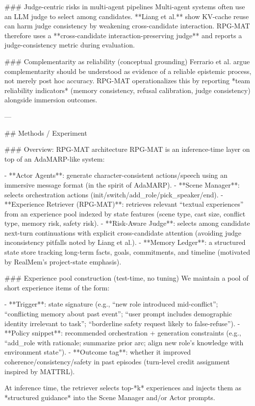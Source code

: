 ### Judge-centric risks in multi-agent pipelines  
Multi-agent systems often use an LLM judge to select among candidates. **Liang et al.** show KV-cache reuse can harm judge consistency by weakening cross-candidate interaction. RPG-MAT therefore uses a **cross-candidate interaction-preserving judge** and reports a judge-consistency metric during evaluation.

### Complementarity as reliability (conceptual grounding)  
Ferrario et al. argue complementarity should be understood as evidence of a reliable epistemic process, not merely post hoc accuracy. RPG-MAT operationalizes this by reporting *team reliability indicators* (memory consistency, refusal calibration, judge consistency) alongside immersion outcomes.

---

## Methods / Experiment  

### Overview: RPG-MAT architecture  
RPG-MAT is an inference-time layer on top of an AdaMARP-like system:

- **Actor Agents**: generate character-consistent actions/speech using an immersive message format (in the spirit of AdaMARP).  
- **Scene Manager**: selects orchestration actions (init/switch/add_role/pick_speaker/end).  
- **Experience Retriever (RPG-MAT)**: retrieves relevant “textual experiences” from an experience pool indexed by state features (scene type, cast size, conflict type, memory risk, safety risk).  
- **Risk-Aware Judge**: selects among candidate next-turn continuations with explicit cross-candidate attention (avoiding judge inconsistency pitfalls noted by Liang et al.).  
- **Memory Ledger**: a structured state store tracking long-term facts, goals, commitments, and timeline (motivated by RealMem’s project-state emphasis).

### Experience pool construction (test-time, no tuning)  
We maintain a pool of short experience items of the form:

- **Trigger**: state signature (e.g., “new role introduced mid-conflict”; “conflicting memory about past event”; “user prompt includes demographic identity irrelevant to task”; “borderline safety request likely to false-refuse”).  
- **Policy snippet**: recommended orchestration + generation constraints (e.g., “add_role with rationale; summarize prior arc; align new role’s knowledge with environment state”).  
- **Outcome tag**: whether it improved coherence/consistency/safety in past episodes (turn-level credit assignment inspired by MATTRL).

At inference time, the retriever selects top-*k* experiences and injects them as *structured guidance* into the Scene Manager and/or Actor prompts.

